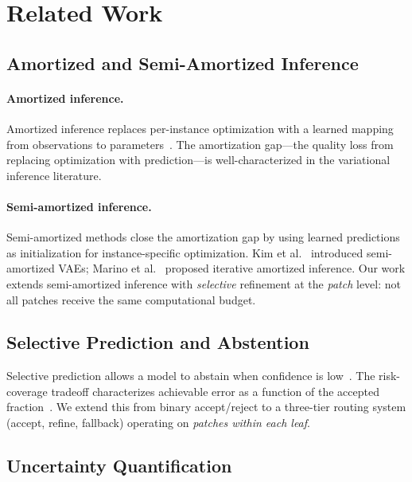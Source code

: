 \documentclass[11pt,a4paper]{article}
\begin{document}
\section{Related Work}
\label{sec:related}

\subsection{Amortized and Semi-Amortized Inference}

\paragraph{Amortized inference.}
Amortized inference replaces per-instance optimization with a learned mapping
from observations to parameters~\cite{kingma2014auto,cranmer2020frontier,
papamakarios2019sequential,amos2023tutorial}.
The amortization gap---the quality loss from replacing optimization with
prediction---is well-characterized in the variational inference literature.

\paragraph{Semi-amortized inference.}
Semi-amortized methods close the amortization gap by using learned predictions
as initialization for instance-specific optimization.
Kim et al.~\cite{kim2018semi} introduced semi-amortized VAEs;
Marino et al.~\cite{marino2018iterative} proposed iterative amortized inference.
Our work extends semi-amortized inference with \emph{selective} refinement
at the \emph{patch} level: not all patches receive the same computational budget.

\subsection{Selective Prediction and Abstention}

Selective prediction allows a model to abstain when confidence is
low~\cite{geifman2017selective,shalev2010trading}.
The risk-coverage tradeoff characterizes achievable error as a function
of the accepted fraction~\cite{kamath2020selective}.
We extend this from binary accept/reject to a three-tier routing system
(accept, refine, fallback) operating on \emph{patches within each leaf}.

\subsection{Uncertainty Quantification}
\end{document}
